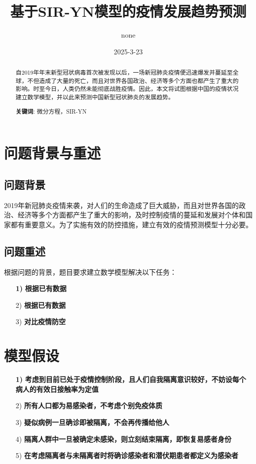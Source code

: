 \documentclass[UTF8]{ctexart}
\title{基于\textbf{SIR-YN}模型的疫情发展趋势预测}
\date{2025-3-23}
\author{none}
\begin{document}
	\maketitle %
	
	\renewcommand{\abstractname}{\Large 摘要\\}
	\begin{abstract}
		\normalsize
		自2019年年末新型冠状病毒首次被发现以后，一场新冠肺炎疫情便迅速爆发并蔓延至全球，不但造成了大量的死亡，而且对世界各国政治、经济等多个方面也都产生了重大的影响。时至今日，人类仍然未能彻底战胜疫情。因此，本文将试图根据中国的疫情状况建立数学模型，并以此来预测中国新型冠状肺炎的发展趋势。


		\textbf{关键词}: 微分方程，SIR-YN
	\end{abstract}


\newpage


	\section{问题背景与重述}
		\subsection{问题背景}
		2019年新冠肺炎疫情来袭，对人们的生命造成了巨大威胁，而且对世界各国的政治、经济等多个方面都产生了重大的影响，及时控制疫情的蔓延和发展对个体和国家都有重要意义。为了实施有效的防控措施，建立有效的疫情预测模型十分必要。
		\subsection{问题重述}
根据问题的背景，题目要求建立数学模型解决以下任务：
\begin{itemize}
	\item [\bf{1)}]\bf{根据已有数据}
	\item [2)]\bf{根据已有数据}
	\item [3)]\bf{对比疫情防空}

\end{itemize}


\newpage


	\section{模型假设}
	
\begin{itemize}
  \item [\bf{1)}]\bf{考虑到目前已处于疫情控制阶段，且人们自我隔离意识较好，不妨设每个病人的有效日接触率为定值}
  \item [2)]\bf{所有人口都为易感染者，不考虑个别免疫体质}
  \item [3)]\bf{疑似病例一旦确诊即被隔离，不会再传播给他人}
  \item [4)]\bf{隔离人群中一旦被确定未感染，则立刻结束隔离，即恢复易感者身份}
  \item [5)]\bf{在考虑隔离者与未隔离者时将确诊感染者和潜伏期患者都定义为感染者}

\end{itemize}
\end{document}
